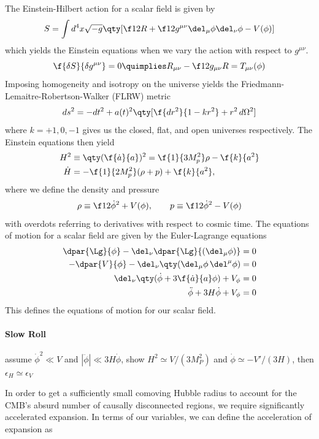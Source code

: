 The Einstein-Hilbert action for a scalar field is given by
\[
S=\int d^4x\sqrt{-g}\qty[\f12R+\f12g^{\mu\nu}\del_\mu\phi\del_\nu\phi-V(\phi)]
\]
which yields the Einstein equations when we vary the action with respect to $g^{\mu\nu}$. 
\[\f{\delta S}{\delta g^{\mu\nu}}=0 \quimplies R_{\mu\nu}-\f12g_{\mu\nu}R=T_{\mu\nu}(\phi)\]
Imposing homogeneity and isotropy on the universe yields the Friedmann-Lemaitre-Robertson-Walker (FLRW) metric
\begin{equation}
    ds^2=-dt^2+a(t)^2\qty[\f{dr^2}{1-kr^2}+r^2\,d\Omega^2]
\end{equation}
where $k=+1,0,-1$ gives us the closed, flat, and open universes respectively. The Einstein equations then yield
\begin{align}
    H^2 &\equiv \qty(\f{\dot a}{a})^2 = \f{1}{3M_p^2}\rho - \f{k}{a^2} \\
    \dot H &= -\f{1}{2M_p^2}(\rho + p)+\f{k}{a^2},
\end{align}
where we define the density and pressure
\[
\rho\equiv \f12\dot{\phi}^2+V(\phi), \qquad p\equiv \f12\dot{\phi}^2-V(\phi)
\]
with overdots referring to derivatives with respect to cosmic time. The equations of motion for a scalar field are given by the Euler-Lagrange equations
\begin{align}
    \dpar{\Lg}{\phi}-\del_\nu\dpar{\Lg}{(\del_\mu \phi)}&=0\nonumber\\
    -\dpar{V}{\phi}-\del_\nu\qty(\del_\mu\phi\,\del^\mu\phi)&=0\nonumber\\
    \del_\nu\qty(\dot{\phi}+3\f{\dot{a}}{a}\phi)+V_\phi&=0\nonumber\\
    \ddot{\phi}+3H\dot{\phi}+V_\phi&=0
\end{align}
This defines the equations of motion for our scalar field. 

\paragraph{Slow Roll} 
assume $\dot\phi^2\ll V$ and $|\ddot\phi|\ll 3H\dot\phi$,  show $H^2\simeq V/(3M_P^2)$ and $\dot\phi\simeq-V'/(3H)$, then $\epsilon_H\simeq \epsilon_V$


In order to get a sufficiently small comoving Hubble radius to account for the CMB's absurd number of causally disconnected regions, we require significantly accelerated expansion. In terms of our variables, we can define the acceleration of expansion as

